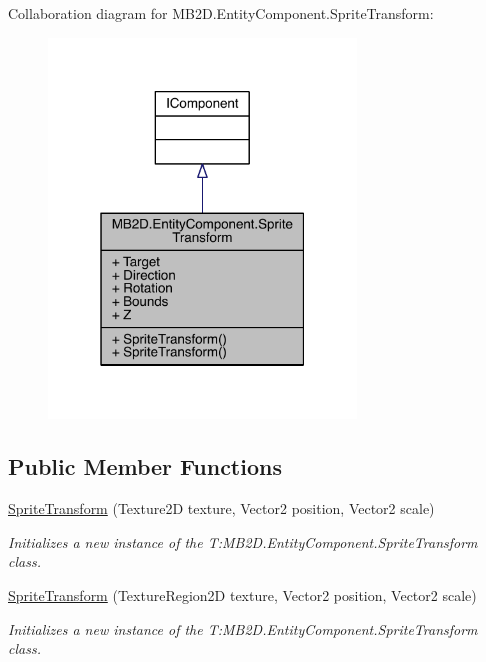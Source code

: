 Collaboration diagram for M\+B2\+D.\+Entity\+Component.\+Sprite\+Transform\+:\nopagebreak
\begin{figure}[H]
\begin{center}
\leavevmode
\includegraphics[width=232pt]{class_m_b2_d_1_1_entity_component_1_1_sprite_transform__coll__graph}
\end{center}
\end{figure}
\subsection*{Public Member Functions}
\begin{DoxyCompactItemize}
\item 
\hyperlink{class_m_b2_d_1_1_entity_component_1_1_sprite_transform_a76c00772a0190f598f50e13f160ea6ca}{Sprite\+Transform} (Texture2D texture, Vector2 position, Vector2 scale)
\begin{DoxyCompactList}\small\item\em Initializes a new instance of the T\+:\+M\+B2\+D.\+Entity\+Component.\+Sprite\+Transform class. \end{DoxyCompactList}\item 
\hyperlink{class_m_b2_d_1_1_entity_component_1_1_sprite_transform_a4d58f27164fa424eb839e74be97e238c}{Sprite\+Transform} (Texture\+Region2D texture, Vector2 position, Vector2 scale)
\begin{DoxyCompactList}\small\item\em Initializes a new instance of the T\+:\+M\+B2\+D.\+Entity\+Component.\+Sprite\+Transform class. \end{DoxyCompactList}\end{DoxyCompactItemize}
